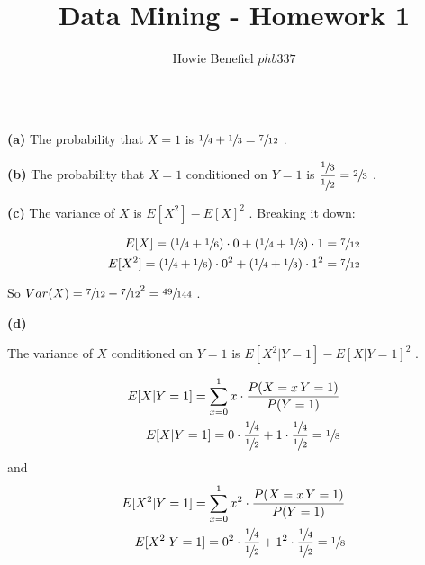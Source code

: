 \documentclass[12pt]{article}
\newenvironment{problem}[2][Problem]{\begin{trivlist}
\item[\hskip \labelsep {\bfseries #1}\hskip \labelsep {\bfseries #2.}]}{\end{trivlist}}
\newenvironment{subproblem}[1]{\textbf{(#1)}}{}
\theoremstyle{definition}
\begin{document}

\title{Data Mining - Homework 1}
\author{Howie Benefiel \(phb337\)}
\maketitle

\begin{problem}{1}
$ $ \newline

\begin{subproblem}{a}
The probability that $ X = 1 $ is $ \sfrac{1}{4} + \sfrac{1}{3} = \sfrac{7}{12} $ .

\end{subproblem}

\begin{subproblem}{b}
The probability that $ X = 1 $ conditioned on $ Y = 1 $ is $ \displaystyle \frac{\sfrac{1}{3}}{\sfrac{1}{2}} = \sfrac{2}{3} $ .

\end{subproblem}

\begin{subproblem}{c}
The variance of $ X $ is $ E[X^2] - E[X] ^ 2 $ .
Breaking it down:

\begin{align*}
E \lbrack X \rbrack = (\sfrac{1}{4} + \sfrac{1}{6}) \cdot 0  + (\sfrac{1}{4} + \sfrac{1}{3}) \cdot 1 = \sfrac{7}{12} \\
E \lbrack X ^ 2 \rbrack = (\sfrac{1}{4} + \sfrac{1}{6}) \cdot 0 ^ 2 + (\sfrac{1}{4} + \sfrac{1}{3}) \cdot 1 ^ 2 = \sfrac{7}{12} \\
\end{align*}

So $ \displaystyle Var(X) = \sfrac{7}{12} - \sfrac{7}{12} ^ 2 = \sfrac{49}{144} $ .


\end{subproblem}

\begin{subproblem}{d}

The variance of $ X $ conditioned on $ Y = 1 $ is $ E[X ^ 2 | Y=1] - E[X | Y=1] ^ 2 $ .

\begin{align*}
E \lbrack X|Y=1 \rbrack = \sum^1_{x=0} x \cdot \frac{P(X=x\, Y=1)}{P(Y=1)} \\
E \lbrack X|Y=1 \rbrack = 0 \cdot \frac{\sfrac{1}{4}}{\sfrac{1}{2}} + 1 \cdot \frac{\sfrac{1}{4}}{\sfrac{1}{2}} = \sfrac{1}{8}
\end{align*}
and
\begin{align*}
E \lbrack X^2|Y=1 \rbrack = \sum^1_{x=0} x^2 \cdot \frac{P(X=x\, Y=1)}{P(Y=1)}\\
E \lbrack X^2|Y=1 \rbrack = 0^2 \cdot \frac{\sfrac{1}{4}}{\sfrac{1}{2}} + 1^2 \cdot \frac{\sfrac{1}{4}}{\sfrac{1}{2}} = \sfrac{1}{8}
\end{align*}


\end{subproblem}
\end{problem}
\end{document}
